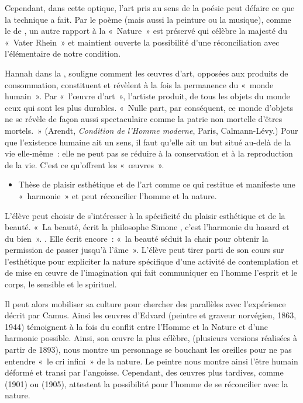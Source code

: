 {Cependant, dans cette optique, l'art pris au sens de la poésie peut défaire ce que la
technique a fait. Par le poème (mais aussi la peinture ou la musique), comme le  de
, un autre rapport à la «~Nature~» est préservé qui célèbre la majesté du «~Vater Rhein~»
et maintient ouverte la possibilité d'une réconciliation avec l'élémentaire de notre condition.

Hannah  dans la , souligne comment les œuvres
d'art, opposées aux produits de consommation, constituent et révèlent à la fois la permanence du
«~monde humain~». Par «~l'œuvre d'art~», l'artiste produit, de tous les objets du monde ceux qui
sont les plus durables. «~Nulle part, par conséquent, ce monde d'objets ne se révèle de façon aussi
spectaculaire comme la patrie non mortelle d'êtres mortels.~» (Arendt, \textit{Condition de l'Homme moderne}, Paris, Calmann-Lévy.) Pour que l'existence humaine ait un sens, il faut qu'elle ait un but
situé au-delà de la vie elle-même~: elle ne peut pas se réduire à la conservation et à la reproduction
de la vie. C'est ce qu'offrent les «~œuvres~».

\begin{itemize}[label=\textbullet]
\item Thèse de plaisir esthétique et de l'art comme ce qui restitue et manifeste une «~harmonie~»
et peut réconcilier l'homme et la nature.
\end{itemize}

L'élève peut choisir de s'intéresser à la spécificité du plaisir esthétique et de la beauté. «~La
beauté, écrit la philosophe Simone , c'est l'harmonie du hasard et du bien~». . Elle écrit
encore~: «~la beauté séduit la chair pour obtenir la permission de passer jusqu'à l'âme~». L'élève
peut tirer parti de son cours sur l'esthétique pour expliciter la nature spécifique d'une activité de
contemplation et de mise en œuvre de l'imagination qui fait communiquer en l'homme l'esprit et
le corps, le sensible et le spirituel.

Il peut alors mobiliser sa culture pour chercher des parallèles avec l'expérience décrit par
Camus. Ainsi les œuvres d'Edvard  (peintre et graveur norvégien, 1863, 1944) témoignent
à la fois du conflit entre l'Homme et la Nature et d'une harmonie possible. Ainsi, son œuvre la plus
célèbre,  (plusieurs versions réalisées à partir de 1893), nous montre un personnage se
bouchant les oreilles pour ne pas entendre «~le cri infini~» de la nature. Le peintre nous montre
ainsi l'être humain déformé et transi par l'angoisse. Cependant, des œuvres plus tardives, comme
 (1901) ou  (1905), attestent la
possibilité pour l'homme de se réconcilier avec la nature.

}
